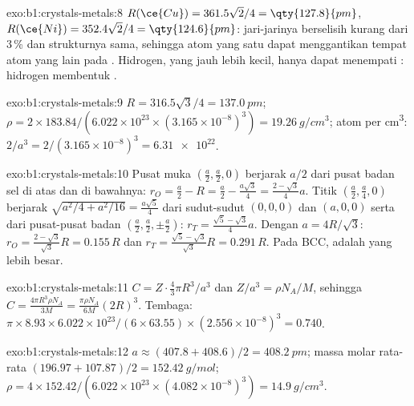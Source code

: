 \begin{solution}{exo:b1:crystals-metals:8}
$R(\ce{Cu}) = 361.5\sqrt2/4 = \qty{127.8}{pm}$, $R(\ce{Ni}) = 352.4\sqrt2/4
= \qty{124.6}{pm}$: jari-jarinya berselisih kurang dari 3\,\% dan
strukturnya sama, sehingga atom yang satu dapat menggantikan tempat atom
yang lain pada . Hidrogen, yang jauh lebih kecil, hanya dapat
menempati : hidrogen membentuk .
\end{solution}

\begin{solution}{exo:b1:crystals-metals:9}
$R = 316.5\sqrt3/4 = \qty{137.0}{pm}$; $\rho = 2 \times 183.84/(6.022 \times
10^{23} \times (3.165 \times 10^{-8})^3) = \qty{19.26}{g/cm^3}$; atom per
\unit{cm^3}: $2/a^3 = 2/(3.165 \times 10^{-8})^3 = \num{6.31e22}$.
\end{solution}

\begin{solution}{exo:b1:crystals-metals:10}
Pusat muka $(\frac a2,\frac a2,0)$ berjarak $a/2$ dari pusat badan sel di
atas dan di bawahnya: $r_O = \frac a2 - R = \frac a2 - \frac{a\sqrt3}{4}
= \frac{2-\sqrt3}{4}a$. Titik $(\frac a2,\frac a4,0)$ berjarak
$\sqrt{a^2/4 + a^2/16} = \frac{a\sqrt5}{4}$ dari sudut-sudut $(0,0,0)$ dan
$(a,0,0)$ serta dari pusat-pusat badan $(\frac a2,\frac a2,\pm\frac a2)$:
$r_T = \frac{\sqrt5 - \sqrt3}{4}a$. Dengan $a = 4R/\sqrt3$:
$r_O = \frac{2-\sqrt3}{\sqrt3}R = 0.155\,R$ dan
$r_T = \frac{\sqrt5-\sqrt3}{\sqrt3}R = 0.291\,R$. Pada BCC,  adalah yang lebih besar.
\end{solution}

\begin{solution}{exo:b1:crystals-metals:11}
$C = Z\cdot\frac43\pi R^3/a^3$ dan $Z/a^3 = \rho N_A/M$, sehingga $C =
\frac{4\pi R^3\rho N_A}{3M} = \frac{\pi\rho N_A}{6M}(2R)^3$. Tembaga:
$\pi \times 8.93 \times 6.022 \times 10^{23}/(6 \times 63.55) \times (2.556
\times 10^{-8})^3 = 0.740$.
\end{solution}

\begin{solution}{exo:b1:crystals-metals:12}
$a \approx (407.8 + 408.6)/2 = \qty{408.2}{pm}$; massa molar rata-rata
$(196.97 +
107.87)/2 = \qty{152.42}{g/mol}$; $\rho = 4 \times 152.42/(6.022 \times
10^{23} \times (4.082 \times 10^{-8})^3) = \qty{14.9}{g/cm^3}$.
\end{solution}

